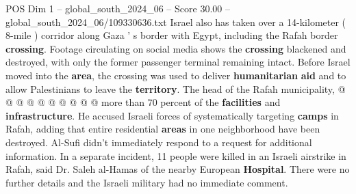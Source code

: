 \begin{textsample}{POS Dim 1 – global\_south\_2024\_06 – Score 30.00 – global\_south\_2024\_06/109330636.txt}
Israel also has taken over a 14-kilometer ( 8-mile ) corridor along Gaza ' s border with Egypt, including the Rafah border \textbf{crossing}.
Footage circulating on social media shows the \textbf{crossing} blackened and destroyed, with only the former passenger terminal remaining intact.
Before Israel moved into the \textbf{area}, the crossing was used to deliver \textbf{humanitarian} \textbf{aid} and to allow Palestinians to leave the \textbf{territory}.
The head of the Rafah municipality, @ @ @ @ @ @ @ @ @ @ more than 70 percent of the \textbf{facilities} and \textbf{infrastructure}.
He accused Israeli forces of systematically targeting \textbf{camps} in Rafah, adding that entire residential \textbf{areas} in one neighborhood have been destroyed.
Al-Sufi didn't immediately respond to a request for additional information.
In a separate incident, 11 people were killed in an Israeli airstrike in Rafah, said Dr.
Saleh al-Hamas of the nearby European \textbf{Hospital}.
There were no further details and the Israeli military had no immediate comment.

\end{textsample}
